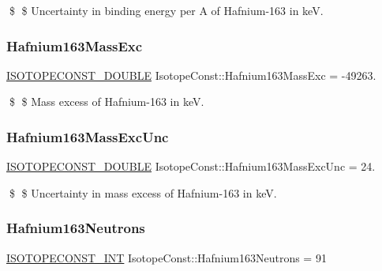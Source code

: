 \$ \$ Uncertainty in binding energy per A of Hafnium-\/163 in keV. \mbox{\label{group___isotope_const-_hafnium-_hf163_ga29f4aca909d0182c1aa2f19f8d70d20c}} 
\subsubsection{\texorpdfstring{Hafnium163\+Mass\+Exc}{Hafnium163MassExc}}
{\footnotesize\ttfamily \mbox{\hyperlink{group___isotope_const-_macros_ga8f45a7272ce02c0b4c65c44636ed719a}{I\+S\+O\+T\+O\+P\+E\+C\+O\+N\+S\+T\+\_\+\+D\+O\+U\+B\+LE}} Isotope\+Const\+::\+Hafnium163\+Mass\+Exc = -\/49263.}

\$ \$ Mass excess of Hafnium-\/163 in keV. \mbox{\label{group___isotope_const-_hafnium-_hf163_ga57923d070bc9f11eab1703ee57645c7c}} 
\subsubsection{\texorpdfstring{Hafnium163\+Mass\+Exc\+Unc}{Hafnium163MassExcUnc}}
{\footnotesize\ttfamily \mbox{\hyperlink{group___isotope_const-_macros_ga8f45a7272ce02c0b4c65c44636ed719a}{I\+S\+O\+T\+O\+P\+E\+C\+O\+N\+S\+T\+\_\+\+D\+O\+U\+B\+LE}} Isotope\+Const\+::\+Hafnium163\+Mass\+Exc\+Unc = 24.}

\$ \$ Uncertainty in mass excess of Hafnium-\/163 in keV. \mbox{\label{group___isotope_const-_hafnium-_hf163_gae887470686627202cb1249ad69d8a42c}} 
\subsubsection{\texorpdfstring{Hafnium163\+Neutrons}{Hafnium163Neutrons}}
{\footnotesize\ttfamily \mbox{\hyperlink{group___isotope_const-_macros_ga5f18360b3e99483a35c32d789e62621c}{I\+S\+O\+T\+O\+P\+E\+C\+O\+N\+S\+T\+\_\+\+I\+NT}} Isotope\+Const\+::\+Hafnium163\+Neutrons = 91}

